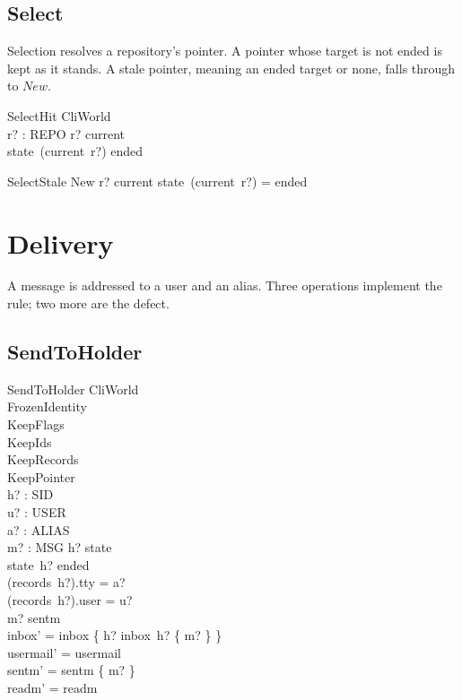 \documentclass[a4paper,10pt,fleqn]{article}
\begin{document}
\subsection{Select}

Selection resolves a repository's pointer.  A pointer whose target is
not ended is kept as it stands.  A stale pointer, meaning an ended
target or none, falls through to $New$.

\begin{schema}{SelectHit}
  \Xi CliWorld \\
  r? : REPO
  \where
  r? \in \dom current \\
  state~(current~r?) \neq ended
\end{schema}

\begin{schema}{SelectStale}
  New
  \where
  r? \notin \dom current \lor state~(current~r?) = ended
\end{schema}

\section{Delivery}

A message is addressed to a user and an alias.  Three operations
implement the rule; two more are the defect.

\subsection{SendToHolder}

\begin{schema}{SendToHolder}
  \Delta CliWorld \\
  FrozenIdentity \\
  KeepFlags \\
  KeepIds \\
  KeepRecords \\
  KeepPointer \\
  h? : SID \\
  u? : USER \\
  a? : ALIAS \\
  m? : MSG
  \where
  h? \in \dom state \\
  state~h? \neq ended \\
  (records~h?).tty = a? \\
  (records~h?).user = u? \\
  m? \notin sentm \\
  inbox' = inbox \oplus \{ h? \mapsto inbox~h? \cup \{ m? \} \} \\
  usermail' = usermail \\
  sentm' = sentm \cup \{ m? \} \\
  readm' = readm
\end{schema}
\end{document}
